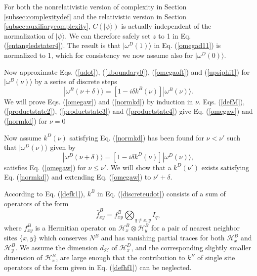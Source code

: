 \documentclass[12pt,amsmath,amssymb,onecolumn]{revtex4-2}
\begin{document}
For both the nonrelativistic version of complexity in Section \ref{subsec:complexitydef}
and the relativistic version in Section \ref{subsec:auxiliarycomplexity},
$C( |\psi \rangle )$ is actually independent of the normalization of $|\psi \rangle $. We can therefore
safely set $z$ to 1 in Eq. (\ref{entangledstater4}). The result is that $|\omega^D(1) \rangle $ in
Eq. (\ref{omegad11}) is normalized to 1, which for consistency we now assume
also for $|\omega^D(0) \rangle $.

Now approximate Eqs. (\ref{udot}), (\ref{uboundary0}), (\ref{omegaoft}) and
(\ref{upsiphi1}) for $|\omega^B(\nu) \rangle $
by a series of discrete steps
\begin{equation}
  \label{discreteudot}
  |\omega^B( \nu + \delta) \rangle  = [1 -i\delta k^B( \nu)] |\omega^B( \nu) \rangle .
\end{equation}
We will prove Eqs. (\ref{omegaw}) and (\ref{normkd}) by induction in $\nu$.
Eqs. (\ref{defM}), (\ref{productstate2}), (\ref{productstate3}) and
(\ref{productstate4}) give Eq. (\ref{omegaw}) and (\ref{normkd}) for $\nu = 0$

Now assume $k^D( \nu)$ satisfying Eq. (\ref{normkd})
has been found for $\nu < \nu'$ such that
$|\omega^D(\nu) \rangle $ given by
\begin{equation}
  \label{discreteudotd}
  |\omega^D( \nu + \delta) \rangle  = [1 -i\delta k^D( \nu)] |\omega^D( \nu) \rangle ,
\end{equation}
satisfies Eq. (\ref{omegaw}) for $\nu \le \nu'$.
We will show that a $k^D( \nu')$ exists satisfying Eq. (\ref{normkd}) and
extending Eq. (\ref{omegaw}) to $\nu' + \delta$.

According to Eq. (\ref{defk1}), $k^B$ in Eq. (\ref{discreteudot}) 
consists of a sum of operators
of the form
\begin{equation}
\label{defhf3}
\hat{ f}^B_{xy} =  f^B_{xy} \bigotimes_{q \ne x,y} I_q, 
\end{equation}
where $f^B_{xy}$ is a Hermitian operator on
$\mathcal{H}^B_x \otimes \mathcal{H}^B_y$ for a pair of nearest neighbor sites
$\{x,y\}$ which conserves $N^B$ and has vanishing partial traces
for both $\mathcal{H}^B_x$ and $\mathcal{H}^B_y$.
We  assume the dimension $d_\mathcal{H}$ of $\mathcal{H}^D_x$,
and the corresponding slightly smaller dimension of $\mathcal{H}^B_x$,
are large enough that the contribution
to $k^B$ of single site operators of the form
given in Eq. (\ref{defhf1}) can
be neglected.
\end{document}
